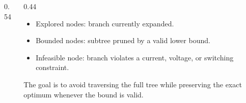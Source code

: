 \begin{frame}
\begin{columns}[T,totalwidth=\textwidth]
\begin{column}{0.54\textwidth}
		\end{column}
		\begin{column}{0.44\textwidth}

			\begin{itemize}
				\item \textcolor{signalgamma}{Explored nodes}: branch currently expanded.
				\item \textcolor{signalbeta}{Bounded nodes}: subtree pruned by a valid lower bound.
				\item \textcolor{signaldelta}{Infeasible node}: branch violates a current, voltage, or switching constraint.
			\end{itemize}
			The goal is to avoid traversing the full tree while preserving the exact optimum whenever the bound is valid.
		\end{column}
	\end{columns}
\end{frame}


